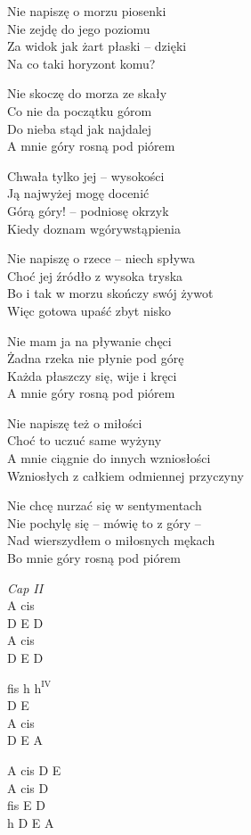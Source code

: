 \begin{text}
    \hfill\break
    Nie napiszę o morzu piosenki\\
    Nie zejdę do jego poziomu\\
    Za widok jak żart płaski -- dzięki\\
    Na co taki horyzont komu?

    Nie skoczę do morza ze skały\\
    Co nie da początku górom\\
    Do nieba stąd jak najdalej\\
    A mnie góry rosną pod piórem

    \vin Chwała tylko jej -- wysokości\\
    \vin Ją najwyżej mogę docenić\\
    \vin Górą góry! -- podniosę okrzyk\\
    \vin Kiedy doznam wgórywstąpienia

    Nie napiszę o rzece -- niech spływa\\
    Choć jej źródło z wysoka tryska\\
    Bo i tak w morzu skończy swój żywot\\
    Więc gotowa upaść zbyt nisko

    Nie mam ja na pływanie chęci\\
    Żadna rzeka nie płynie pod górę\\
    Każda płaszczy się, wije i kręci\\
    A mnie góry rosną pod piórem

    Nie napiszę też o miłości\\
    Choć to uczuć same wyżyny\\
    A mnie ciągnie do innych wzniosłości\\
    Wzniosłych z całkiem odmiennej przyczyny

    Nie chcę nurzać się w sentymentach\\
    Nie pochylę się -- mówię to z góry --\\
    Nad wierszydłem o miłosnych mękach\\
    Bo mnie góry rosną pod piórem
\end{text}
\begin{chord}
    \textit{Cap II}\\
    A cis\\
    D E D\\
    A cis\\
    D E D

    fis h $\mathrm{h^{IV}}$\\
    D E\\
    A cis\\
    D E A

    A cis D E\\
    A cis D\\
    fis E D\\
    h D E A
\end{chord}

